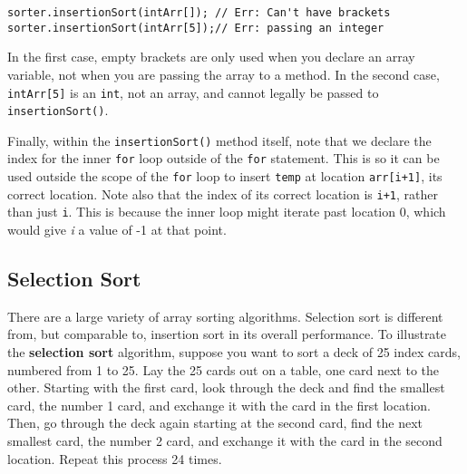 \begin{jjjlisting}
\begin{lstlisting}
sorter.insertionSort(intArr[]); // Err: Can't have brackets
sorter.insertionSort(intArr[5]);// Err: passing an integer
\end{lstlisting}
\end{jjjlisting}

\noindent In the first case, empty brackets are only used when you
declare an array variable, not when you are passing the array to a
method.  In the second case, {\tt intArr[5]} is an {\tt int}, not an
array, and cannot legally be passed to {\tt insertionSort()}.


\noindent Finally, within the {\tt insertionSort()} method itself,
note that we declare the index for the inner {\tt for} loop outside of
the {\tt for} statement. This is so it can be used outside the scope
of the {\tt for} loop to insert {\tt temp} at location {\tt arr[i+1]}, its
correct location. Note also that the index of its correct location is
{\tt i+1}, rather than just {\tt i}. This is because the inner loop
might iterate past location 0, which would give {\em i} a value of -1
at that point.


\subsection{Selection Sort}
\label{sec-selectionsort}

\noindent There are a large variety of array sorting
algorithms. Selection sort is different from, but comparable to,
insertion sort in its overall performance.  To illustrate the {\bf
selection sort} algorithm, suppose you want to sort a deck of 25 index
cards, numbered from 1 to 25.  Lay the 25 cards out on a table, one
card next to the
 other.  Starting with the
first card, look through the deck and find the smallest card, the
number 1 card, and exchange it with the card in the first location.
Then, go through the deck again starting at the second card, find the
next smallest card, the number 2 card, and exchange it with the card
in the second location.  Repeat this process 24 times.

